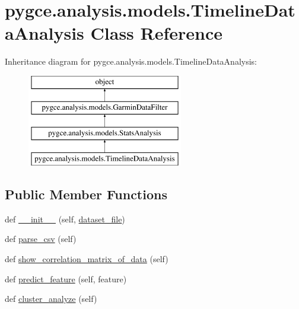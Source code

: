 \hypertarget{classpygce_1_1analysis_1_1models_1_1_timeline_data_analysis}{}\section{pygce.\+analysis.\+models.\+Timeline\+Data\+Analysis Class Reference}
\label{classpygce_1_1analysis_1_1models_1_1_timeline_data_analysis}
Inheritance diagram for pygce.\+analysis.\+models.\+Timeline\+Data\+Analysis\+:\begin{figure}[H]
\begin{center}
\leavevmode
\includegraphics[height=4.000000cm]{classpygce_1_1analysis_1_1models_1_1_timeline_data_analysis}
\end{center}
\end{figure}
\subsection*{Public Member Functions}
\begin{DoxyCompactItemize}
\item 
def \hyperlink{classpygce_1_1analysis_1_1models_1_1_timeline_data_analysis_a7fccb7531cafe3b618ad7026db2d3b53}{\+\_\+\+\_\+init\+\_\+\+\_\+} (self, \hyperlink{classpygce_1_1analysis_1_1models_1_1_garmin_data_filter_a7bb7be05577c2d31546e27823a5d11c5}{dataset\+\_\+file})
\item 
def \hyperlink{classpygce_1_1analysis_1_1models_1_1_timeline_data_analysis_a1a02ca1184152091fc1f66306e1ac02c}{parse\+\_\+csv} (self)
\item 
def \hyperlink{classpygce_1_1analysis_1_1models_1_1_timeline_data_analysis_ac5f4540c89ea52ccbd5c28ce850bc1d3}{show\+\_\+correlation\+\_\+matrix\+\_\+of\+\_\+data} (self)
\item 
def \hyperlink{classpygce_1_1analysis_1_1models_1_1_timeline_data_analysis_ab769c6f075333081a68712e0ecf8b094}{predict\+\_\+feature} (self, feature)
\item 
def \hyperlink{classpygce_1_1analysis_1_1models_1_1_timeline_data_analysis_a7d55131ad1d82897d94b009e8d48ea26}{cluster\+\_\+analyze} (self)
\end{DoxyCompactItemize}
